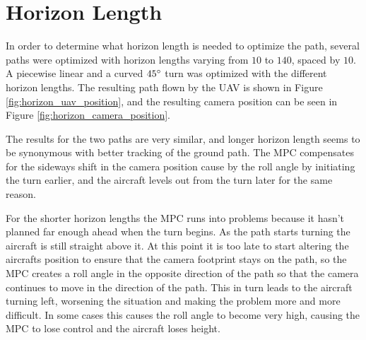 \section{Horizon Length}

In order to determine what horizon length is needed to optimize the path, several paths were optimized with horizon lengths varying from $10$ to $140$, spaced by $10$. A piecewise linear and a curved $45\degree$ turn was optimized with the different horizon lengths. The resulting path flown by the UAV is shown in Figure \ref{fig:horizon_uav_position}, and the resulting camera position can be seen in Figure \ref{fig:horizon_camera_position}.

The results for the two paths are very similar, and longer horizon length seems to be synonymous with better tracking of the ground path. The MPC compensates for the sideways shift in the camera position cause by the roll angle by initiating the turn earlier, and the aircraft levels out from the turn later for the same reason.

For the shorter horizon lengths the MPC runs into problems because it hasn't planned far enough ahead when the turn begins. As the path starts turning the aircraft is still straight above it. At this point it is too late to start altering the aircrafts position to ensure that the camera footprint stays on the path, so the MPC creates a roll angle in the opposite direction of the path so that the camera continues to move in the direction of the path. This in turn leads to the aircraft turning left, worsening the situation and making the problem more and more difficult. In some cases this causes the roll angle to become very high, causing the MPC to lose control and the aircraft loses height.


